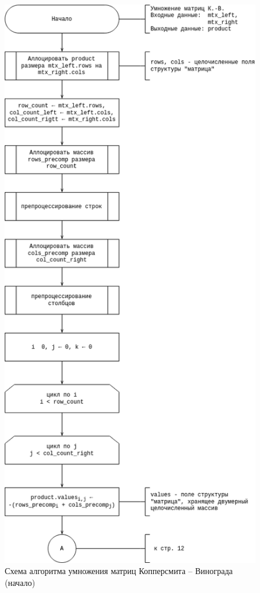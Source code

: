 \begin{figure}[H]
	\centering
	\includegraphics[width=0.65\linewidth]{assets/mtx-win1.drawio.png}
	\caption{Схема алгоритма умножения матриц Копперсмита -- Винограда (начало)}
	\label{fig:win-1}
\end{figure}

